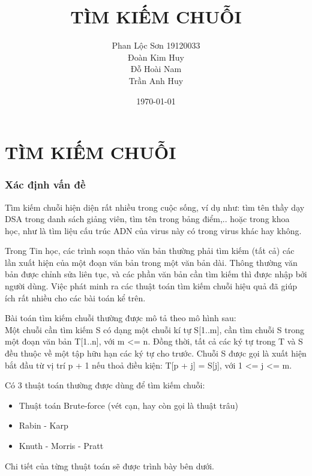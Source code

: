 \documentclass[a4paper,11pt]{article}
\title{TÌM KIẾM CHUỖI}
\author{
	Phan Lộc Sơn 19120033\\
	Đoàn Kim Huy \\
	Đỗ Hoài Nam \\
	Trần Anh Huy
}
\date{\today}
\begin{document}
	\maketitle
	\part*{TÌM KIẾM CHUỖI}
	
	\section{Xác định vấn đề}
	Tìm kiếm chuỗi hiện diện rất nhiều trong cuộc sống, ví dụ như: tìm tên thầy dạy DSA trong danh sách giảng viên,
	tìm tên trong bảng điểm,.. hoặc trong khoa học, như là tìm liệu cấu trúc ADN của virus này có trong virus khác hay không.

	Trong Tin học, các trình soạn thảo văn bản thường phải tìm kiếm (tất cả) các lần xuất hiện của một đoạn văn bản trong một văn bản dài. Thông thường văn bản được chỉnh sửa liên tục, và các phần văn bản cần tìm kiếm thì được nhập bởi người dùng. Việc phát minh ra các thuật toán tìm kiếm chuỗi hiệu quả đã giúp ích rất nhiều cho các bài toán kể trên.

	Bài toán tìm kiếm chuỗi thường được mô tả theo mô hình sau: \\
	Một chuỗi cần tìm kiếm S có dạng một chuỗi kí tự S[1..m], cần tìm chuỗi S trong một đoạn văn bản T[1..n], với m <= n. Đồng thời, tất cả các ký tự trong T và S đều thuộc về một tập hữu hạn các ký tự cho trước. Chuỗi S được gọi là xuất hiện bắt đầu từ vị trí p + 1 nếu thoả điều kiện: T[p + j] = S[j], với 1 <= j <= m.
	
	\vspace*{3mm}
	Có 3 thuật toán thường được dùng để tìm kiếm chuỗi:
	\begin{itemize}
	    \item Thuật toán Brute-force (vét cạn, hay còn gọi là thuật trâu)
	    \item Rabin - Karp
	    \item Knuth - Morris - Pratt
	\end{itemize}
	Chi tiết của từng thuật toán sẽ được trình bày bên dưới.
\end{document}
